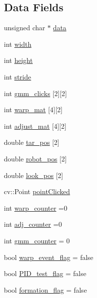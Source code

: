 \subsection*{Data Fields}
\begin{DoxyCompactItemize}
\item 
unsigned char $\ast$ \hyperlink{class_image_view_aafc2f72cb5d3cbc5f23eb303b30982da}{data}
\item 
int \hyperlink{class_image_view_a5a491c5256173430d4b16d9abea80727}{width}
\item 
int \hyperlink{class_image_view_a3e4a6ddf0a10ae710405cdd6e73924f6}{height}
\item 
int \hyperlink{class_image_view_aee8be5a0041dbc9c04cdc439d08cc3df}{stride}
\item 
int \hyperlink{class_image_view_a88c64a515c30ba486252ba440bf9f9eb}{gmm\+\_\+clicks} \mbox{[}2\mbox{]}\mbox{[}2\mbox{]}
\item 
int \hyperlink{class_image_view_a483ffadadbb0b3059073c3c6af37bdc7}{warp\+\_\+mat} \mbox{[}4\mbox{]}\mbox{[}2\mbox{]}
\item 
int \hyperlink{class_image_view_a59c7771f6220f24b661c3ba8ea3b27f1}{adjust\+\_\+mat} \mbox{[}4\mbox{]}\mbox{[}2\mbox{]}
\item 
double \hyperlink{class_image_view_a569238a3b9d094c11637673dba40bf29}{tar\+\_\+pos} \mbox{[}2\mbox{]}
\item 
double \hyperlink{class_image_view_ab97c018602b91e96f318dc92af222aa5}{robot\+\_\+pos} \mbox{[}2\mbox{]}
\item 
double \hyperlink{class_image_view_af6562e3dfd03c0fb66826a7a5bd6e759}{look\+\_\+pos} \mbox{[}2\mbox{]}
\item 
cv\+::\+Point \hyperlink{class_image_view_aaf921d074e2f66a95b190439c19c2a9f}{point\+Clicked}
\item 
int \hyperlink{class_image_view_af8b73549a44458562570771774f7b04b}{warp\+\_\+counter} =0
\item 
int \hyperlink{class_image_view_a69f2acef8641170135ff89dd6d4e9e6c}{adj\+\_\+counter} =0
\item 
int \hyperlink{class_image_view_a1d02972f5193d7ce806802dd2505f1f2}{gmm\+\_\+counter} = 0
\item 
bool \hyperlink{class_image_view_a1a2a3e02d28b64343e62e17069fb1fd8}{warp\+\_\+event\+\_\+flag} = false
\item 
bool \hyperlink{class_image_view_ad94a51f7cd15b92c8c9defa5fb745b6d}{P\+I\+D\+\_\+test\+\_\+flag} = false
\item 
bool \hyperlink{class_image_view_a44427e978ef9239514b7149ebf59022c}{formation\+\_\+flag} = false

\end{DoxyCompactItemize}
